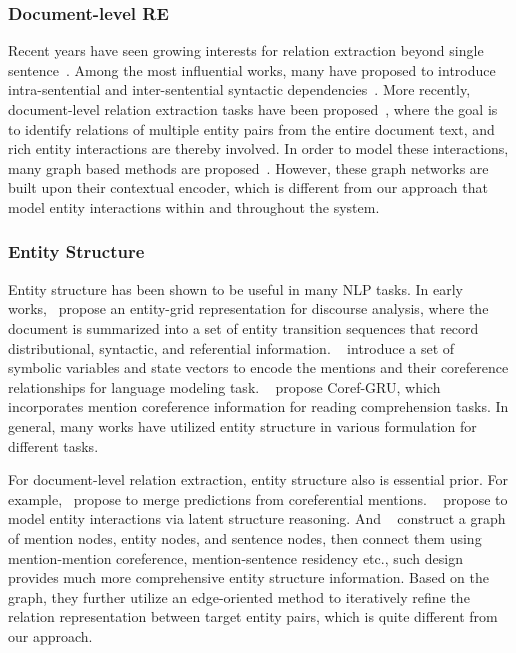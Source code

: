 \documentclass[letterpaper]{article} \usepackage{aaai21}  \usepackage{times}  \usepackage{helvet} \usepackage{courier}  \usepackage[hyphens]{url}  \usepackage{graphicx} \usepackage{booktabs}
\begin{document}
\subsubsection{Document-level RE}
Recent years have seen growing interests for relation extraction beyond single sentence~\cite{quirk-poon-2017-distant,TACL1028}.
Among the most influential works, many have proposed to introduce intra-sentential and inter-sentential syntactic dependencies~\cite{peng2017cross,song-etal-2018-n,gupta2019neural}.
More recently, document-level relation extraction tasks have been proposed~\cite{li2016biocreative,yao-etal-2019-docred}, where the goal is to identify relations of multiple entity pairs from the entire document text, and rich entity interactions are thereby involved.
In order to model these interactions, many graph based methods are proposed~\cite{sahu-etal-2019-inter,christopoulou-etal-2019-connecting,nan-etal-2020-reasoning}.
However, these graph networks are built upon their contextual encoder, which is different from our approach that model entity interactions within and throughout the system.


\subsubsection{Entity Structure}
Entity structure has been shown to be useful in many NLP tasks.
In early works,~\citet{barzilay2008modeling} propose an entity-grid representation for discourse analysis, where the document is summarized into a set of entity transition sequences that record distributional, syntactic, and referential information.
~\citet{ji-etal-2017-dynamic} introduce a set of symbolic variables and state vectors to encode the mentions and their coreference relationships for language modeling task.
~\citet{dhingra-etal-2018-neural} propose Coref-GRU, which incorporates mention coreference information for reading comprehension tasks.
In general, many works have utilized entity structure in various formulation for different tasks.

For document-level relation extraction, entity structure also is essential prior.
For example,~\citet{verga-etal-2018-simultaneously} propose to merge predictions from coreferential mentions.
~\citet{nan-etal-2020-reasoning} propose to model entity interactions via latent structure reasoning.
And ~\citet{christopoulou-etal-2019-connecting} construct a graph of mention nodes, entity nodes, and sentence nodes, then connect them using mention-mention coreference, mention-sentence residency etc., such design provides much more comprehensive entity structure information.
Based on the graph, they further utilize an edge-oriented method to iteratively refine the relation representation between target entity pairs, which is quite different from our approach.
\end{document}
